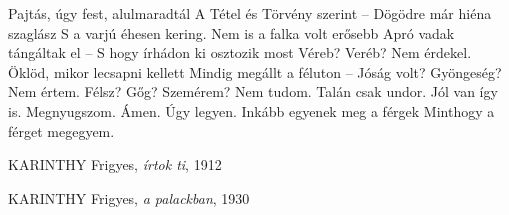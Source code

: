 \documentclass  [12pt]{article}
\begin{document}
\pagebreak



 \cite[2]{Struggle for life}

\begin{titlepage}
    \maketitle
\end{titlepage}


Pajtás, úgy fest, alulmaradtál
A Tétel és Törvény szerint –
Dögödre már hiéna szaglász
S a varjú éhesen kering.
Nem is a falka volt erősebb
Apró vadak tángáltak el –
S hogy írhádon ki osztozik most
Véreb? Veréb? Nem érdekel.
Öklöd, mikor lecsapni kellett
Mindig megállt a féluton –
Jóság volt? Gyöngeség? Nem értem.
Félsz? Gőg? Szemérem? Nem tudom.
Talán csak undor. Jól van így is.
Megnyugszom. Ámen. Úgy legyen.
Inkább egyenek meg a férgek
Minthogy a férget megegyem.\\

\begin{thebibliography}{9}

 KARINTHY Frigyes,
  \textit{ írtok ti},
 1912

 KARINTHY Frigyes,
  \textit{ a palackban},
1930

\end{thebibliography}
\end{document}
